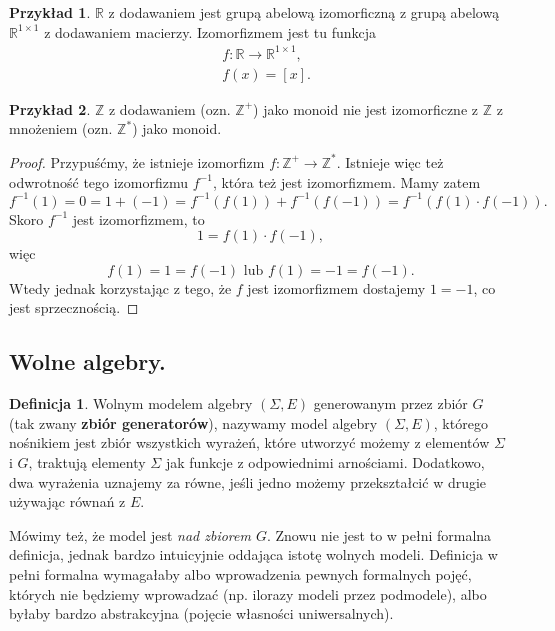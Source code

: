 \documentclass{book}
\theoremstyle{definition}
\newtheorem{definition}{Definicja}[section]
\newtheorem{example}{Przykład}[section]
\begin{document}
\begin{example}
	$\mathbb{R}$ z dodawaniem jest grupą abelową izomorficzną z grupą abelową $\mathbb{R}^{1 \times 1}$ z dodawaniem macierzy.
	Izomorfizmem jest tu funkcja
	\begin{align*}
		&f: \mathbb{R} \to \mathbb{R}^{1 \times 1},\\
		&f(x) = [x].
	\end{align*}
\end{example}

\begin{example}
$\mathbb{Z}$ z dodawaniem (ozn. $\mathbb{Z}^+$)
	jako monoid nie jest izomorficzne z $\mathbb{Z}$ z mnożeniem (ozn. $\mathbb{Z}^*$)
	jako monoid.
\end{example}
\begin{proof}
Przypuśćmy, że istnieje izomorfizm $f: \mathbb{Z}^+ \to \mathbb{Z}^*$. Istnieje więc też odwrotność tego izomorfizmu $f^{-1}$, która też jest izomorfizmem. Mamy zatem
\begin{equation}
    f^{-1}(1) = 0 = 1 + (-1) = f^{-1}(f(1)) + f^{-1}(f(-1)) = f^{-1}(f(1) \cdot f(-1)).
\end{equation}
Skoro $f^{-1}$ jest izomorfizmem, to 
\begin{equation}
    1 = f(1) \cdot f(-1), 
\end{equation}
więc
\begin{equation}
    f(1) = 1 = f(-1) \text{ lub } f(1) = -1 = f(-1).
\end{equation}
Wtedy jednak korzystając z tego, że $f$ jest izomorfizmem dostajemy $1 = -1$, co jest sprzecznością.
\end{proof}

\subsection{Wolne algebry.}

\begin{definition}
    Wolnym modelem algebry $(\Sigma, E)$ generowanym przez zbiór $G$ (tak zwany \textbf{zbiór generatorów}),
    nazywamy model algebry $(\Sigma, E)$, którego nośnikiem jest zbiór wszystkich wyrażeń,
		które utworzyć możemy z elementów $\Sigma$ i $G$, traktują elementy $\Sigma$ jak
		funkcje z odpowiednimi arnościami.
	Dodatkowo,
		dwa wyrażenia uznajemy za równe,
		jeśli jedno możemy przekształcić w drugie używając równań z $E$.
\end{definition}
Mówimy też, że model jest \textit{nad zbiorem $G$}.
Znowu nie jest to w pełni formalna definicja,
	jednak bardzo intuicyjnie oddająca istotę wolnych modeli.
Definicja w pełni formalna wymagałaby albo wprowadzenia pewnych formalnych pojęć,
	których nie będziemy wprowadzać (np. ilorazy modeli przez podmodele),
	albo byłaby bardzo abstrakcyjna (pojęcie własności uniwersalnych).
\end{document}
